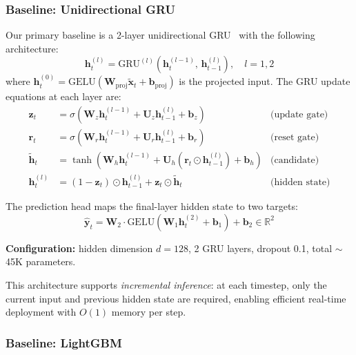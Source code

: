 \documentclass[11pt,a4paper]{article}
\newcommand{\R}{\mathbb{R}}
\newcommand{\bx}{\mathbf{x}}
\newcommand{\bh}{\mathbf{h}}
\newcommand{\by}{\mathbf{y}}
\newcommand{\bW}{\mathbf{W}}
\newcommand{\bU}{\mathbf{U}}
\begin{document}
\subsubsection{Baseline: Unidirectional GRU}
\label{sec:gru_baseline}

Our primary baseline is a 2-layer unidirectional GRU~\cite{cho2014gru} with the following architecture:
\begin{equation}
    \bh_t^{(l)} = \text{GRU}^{(l)}\!\left(\bh_t^{(l-1)},\, \bh_{t-1}^{(l)}\right), \quad l = 1, 2
    \label{eq:gru_stack}
\end{equation}
where $\bh_t^{(0)} = \text{GELU}(\bW_{\text{proj}} \tilde{\bx}_t + \mathbf{b}_{\text{proj}})$ is the projected input. The GRU update equations at each layer are:
\begin{align}
    \mathbf{z}_t &= \sigma\!\left(\bW_z \bh_t^{(l-1)} + \bU_z \bh_{t-1}^{(l)} + \mathbf{b}_z\right) & \text{(update gate)} \label{eq:gru_z} \\
    \mathbf{r}_t &= \sigma\!\left(\bW_r \bh_t^{(l-1)} + \bU_r \bh_{t-1}^{(l)} + \mathbf{b}_r\right) & \text{(reset gate)} \label{eq:gru_r} \\
    \tilde{\bh}_t &= \tanh\!\left(\bW_h \bh_t^{(l-1)} + \bU_h (\mathbf{r}_t \odot \bh_{t-1}^{(l)}) + \mathbf{b}_h\right) & \text{(candidate)} \label{eq:gru_h} \\
    \bh_t^{(l)} &= (1 - \mathbf{z}_t) \odot \bh_{t-1}^{(l)} + \mathbf{z}_t \odot \tilde{\bh}_t & \text{(hidden state)} \label{eq:gru_state}
\end{align}

The prediction head maps the final-layer hidden state to two targets:
\begin{equation}
    \hat{\by}_t = \bW_2 \cdot \text{GELU}(\bW_1 \bh_t^{(2)} + \mathbf{b}_1) + \mathbf{b}_2 \in \R^2
    \label{eq:head}
\end{equation}

\textbf{Configuration:} hidden dimension $d = 128$, 2 GRU layers, dropout 0.1, total $\sim$45K parameters.

This architecture supports \emph{incremental inference}: at each timestep, only the current input and previous hidden state are required, enabling efficient real-time deployment with $O(1)$ memory per step.


\subsubsection{Baseline: LightGBM}
\label{sec:lgbm}
\end{document}
